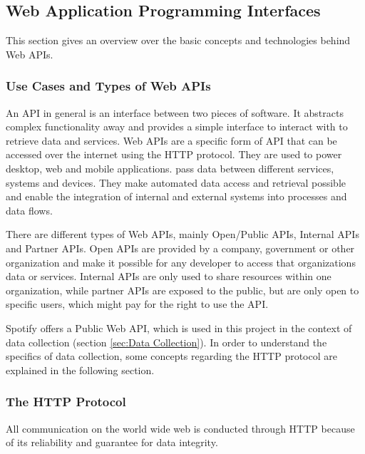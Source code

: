 \subsection{Web Application Programming Interfaces}

This section gives an overview over the basic concepts and technologies behind Web \acp{API}.

\subsubsection{Use Cases and Types of Web APIs}

An \ac{API} in general is an interface between two pieces of software\cite[S.1]{reddy2011api}.
It abstracts complex functionality away and provides a simple interface
to interact with to retrieve data and services\cite{Mozilla}.
Web APIs are a specific form of API that can be accessed over the internet
using the HTTP protocol.\cite{StoplightAPITypes}
They are used to power desktop, web and mobile applications. pass data between different
services, systems and devices. They make automated data access and retrieval possible
and enable the integration of internal and external systems into processes and data flows.\cite{Lane2019WhatIs}

There are different types of Web APIs, mainly Open/Public APIs, Internal APIs and Partner APIs\cite{StoplightAPITypes}.
Open APIs are provided by a company, government or other organization and make it possible for any developer
to access that organizations data or services\cite{StoplightAPITypes}.
Internal APIs are only used to share resources within one organization, while
partner APIs are exposed to the public, but are only open to specific users, which might pay for
the right to use the API\cite{StoplightAPITypes}.

Spotify offers a Public Web API, which is used in this project in the context of data collection (section \ref{sec:Data Collection}).
In order to understand the specifics of data collection,
some concepts regarding the \ac{HTTP} protocol are explained in the following section.

\subsubsection{The HTTP Protocol}

All communication on the world wide web is conducted through \ac{HTTP}
because of its reliability and guarantee for data integrity\cite[3f.]{gourley2002http}.


